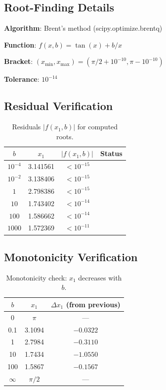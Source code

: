 \documentclass[11pt,a4paper]{article}
\newcommand{\emark}{\textcolor{green!70!black}{\checkmark}}
\theoremstyle{definition}
\theoremstyle{plain}
\theoremstyle{remark}
\begin{document}
\subsection{Root-Finding Details}

\textbf{Algorithm}: Brent's method (scipy.optimize.brentq)

\textbf{Function}: $f(x, b) = \tan(x) + b/x$

\textbf{Bracket}: $(x_{\min}, x_{\max}) = (\pi/2 + 10^{-10}, \pi - 10^{-10})$

\textbf{Tolerance}: $10^{-14}$

\subsection{Residual Verification}

\begin{table}[htbp]
\centering
\caption{Residuals $|f(x_1, b)|$ for computed roots.}
\label{tab:residuals}
\begin{tabular}{@{}cccc@{}}
\toprule
$b$ & $x_1$ & $|f(x_1, b)|$ & Status \\
\midrule
$10^{-4}$ & 3.141561 & $< 10^{-15}$ & \emark \\
$10^{-2}$ & 3.138406 & $< 10^{-15}$ & \emark \\
$1$ & 2.798386 & $< 10^{-15}$ & \emark \\
$10$ & 1.743402 & $< 10^{-14}$ & \emark \\
$100$ & 1.586662 & $< 10^{-14}$ & \emark \\
$1000$ & 1.572369 & $< 10^{-11}$ & \emark \\
\bottomrule
\end{tabular}
\end{table}

\subsection{Monotonicity Verification}

\begin{table}[htbp]
\centering
\caption{Monotonicity check: $x_1$ decreases with $b$.}
\label{tab:monotonicity}
\begin{tabular}{@{}ccc@{}}
\toprule
$b$ & $x_1$ & $\Delta x_1$ (from previous) \\
\midrule
0 & $\pi$ & --- \\
0.1 & 3.1094 & $-0.0322$ \\
1 & 2.7984 & $-0.3110$ \\
10 & 1.7434 & $-1.0550$ \\
100 & 1.5867 & $-0.1567$ \\
$\infty$ & $\pi/2$ & --- \\
\bottomrule
\end{tabular}
\end{table}
\end{document}
